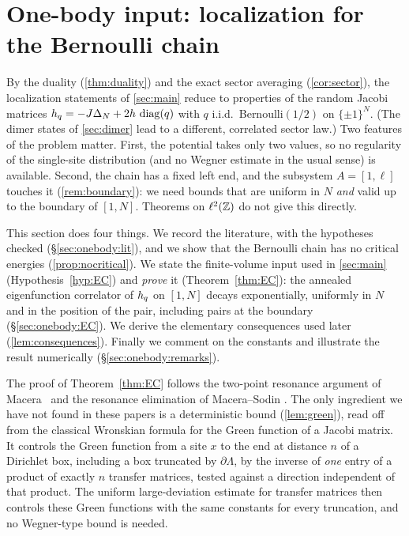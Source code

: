 \providecommand{\Ilam}{I_\lambda}
\providecommand{\gstar}{\gamma_*}
\providecommand{\Bad}{\mathcal{B}}
\providecommand{\Ends}{\mathcal{E}}
\providecommand{\Wr}{\mathcal{W}}
\providecommand{\sgnob}{\operatorname{sgn}}
\providecommand{\eone}{e_1}

\section{One-body input: localization for the Bernoulli chain}\label{sec:onebody}

By the duality (\cref{thm:duality}) and the exact sector averaging (\cref{cor:sector}), the
localization statements of \cref{sec:main} reduce to properties of the random Jacobi matrices
$h_{q}=-J\Delta_N+2h\,\operatorname{diag}(q)$ with $q$ i.i.d.\ Bernoulli$(1/2)$ on $\{\pm1\}^N$.  (The dimer states of
\cref{sec:dimer} lead to a different, correlated sector law.)  Two features of the
problem matter.  First, the potential takes only two values, so no regularity of the single-site
distribution (and no Wegner estimate in the usual sense) is available.  Second, the chain has a
fixed left end, and the subsystem $A=[1,\ell]$ touches it (\cref{rem:boundary}): we need bounds that
are uniform in $N$ \emph{and} valid up to the boundary of $[1,N]$.  Theorems on $\ell^2(\mathbb{Z})$ do not
give this directly.

This section does four things.  We record the literature, with the hypotheses checked
(\S\ref{sec:onebody:lit}), and we show that the Bernoulli chain has no critical energies
(\cref{prop:nocritical}).  We state the finite-volume input used in \cref{sec:main}
(Hypothesis~\ref{hyp:EC}) and \emph{prove} it (Theorem~\ref{thm:EC}): the annealed eigenfunction
correlator of $h_{q}$ on $[1,N]$ decays exponentially, uniformly in $N$ and in the position of the
pair, including pairs at the boundary (\S\ref{sec:onebody:EC}).  We derive the elementary
consequences used later (\cref{lem:consequences}).  Finally we comment on the constants and
illustrate the result numerically (\S\ref{sec:onebody:remarks}).

The proof of Theorem~\ref{thm:EC} follows the two-point resonance argument of
Macera~\cite[Sect.~2]{Macera2023} and the resonance elimination of Macera--Sodin
\cite[Sect.~2.3]{MaceraSodin2022}.  The only ingredient we have not found in these papers is a
deterministic bound (\cref{lem:green}), read off from the classical Wronskian formula for the Green
function of a Jacobi matrix.  It controls the Green function from a site $x$ to the end at distance
$n$ of a Dirichlet box, including a box truncated by $\partial\Lambda$, by the inverse of \emph{one}
entry of a product of exactly $n$ transfer matrices, tested against a direction independent of that
product.  The uniform large-deviation estimate for transfer matrices then controls these Green
functions with the same constants for every truncation, and no Wegner-type bound is needed.


